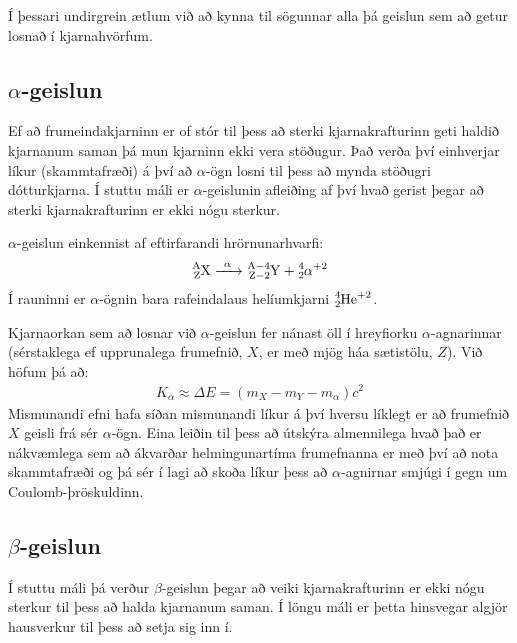 \ifdefined \wholebook \else\documentclass[oneside]{book}\usepackage{EdlBook}\graphicspath{{figures/}}
\begin{document}
Í þessari undirgrein ætlum við að kynna til sögunnar alla þá geislun sem að getur losnað í kjarnahvörfum.

\subsection{\boldmath $\alpha$-geislun}

Ef að frumeindakjarninn er of stór til þess að sterki kjarnakrafturinn geti haldið kjarnanum saman þá mun kjarninn ekki vera stöðugur. Það verða því einhverjar líkur (skammtafræði) á því að $\alpha$-ögn losni til þess að mynda stöðugri dótturkjarna. Í stuttu máli er $\alpha$-geislunin afleiðing af því hvað gerist þegar að sterki kjarnakrafturinn er ekki nógu sterkur.

\begin{tcolorbox}
\begin{definition}
$\alpha$-geislun einkennist af eftirfarandi hrörnunarhvarfi:
\begin{align*}
    \ce{^{A}_{Z}X ->[\alpha] ^{A-4}_{Z-2}Y + ^{4}_{2}\alpha}^{+2}
\end{align*}
Í rauninni er $\alpha$-ögnin bara rafeindalaus helíumkjarni $\ce{^4_2He^{+2}}$.
\end{definition}
\end{tcolorbox}

Kjarnaorkan sem að losnar við $\alpha$-geislun fer nánast öll í hreyfiorku $\alpha$-agnarinnar (sérstaklega ef upprunalega frumefnið, $X$, er með mjög háa sætistölu, $Z$). Við höfum þá að:
\begin{align*}
    K_{\alpha} \approx \Delta E  = \left( m_X - m_Y - m_\alpha \right)c^2
\end{align*}
Mismunandi efni hafa síðan mismunandi líkur á því hversu líklegt er að frumefnið $X$ geisli frá sér $\alpha$-ögn. Eina leiðin til þess að útskýra almennilega hvað það er nákvæmlega sem að ákvarðar helmingunartíma frumefnanna er með því að nota skammtafræði og þá sér í lagi að skoða líkur þess að $\alpha$-agnirnar smjúgi í gegn um Coulomb-þröskuldinn.



\subsection{\boldmath $\beta$-geislun}

Í stuttu máli þá verður $\beta$-geislun þegar að veiki kjarnakrafturinn er ekki nógu sterkur til þess að halda kjarnanum saman. Í löngu máli er þetta hinsvegar algjör hausverkur til þess að setja sig inn í. 
\end{document}
